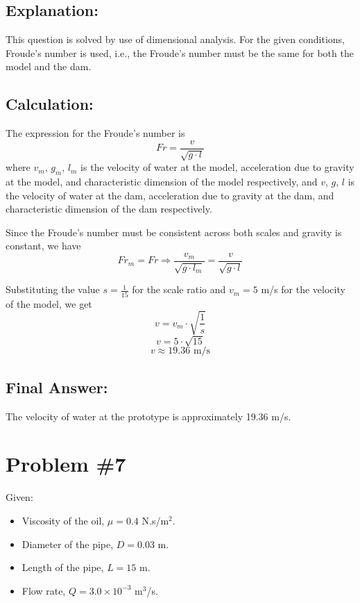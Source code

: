 \documentclass{article}
\begin{document}
\subsection*{Explanation:}
This question is solved by use of dimensional analysis. For the given conditions, Froude's number is used, i.e., the Froude's number must be the same for both the model and the dam.

\subsection*{Calculation:}
The expression for the Froude's number is
\[ Fr = \frac{v}{\sqrt{g \cdot l}} \]
where \( v_m \), \( g_m \), \( l_m \) is the velocity of water at the model, acceleration due to gravity at the model, and characteristic dimension of the model respectively, and \( v \), \( g \), \( l \) is the velocity of water at the dam, acceleration due to gravity at the dam, and characteristic dimension of the dam respectively.

Since the Froude's number must be consistent across both scales and gravity is constant, we have
\[ Fr_m = Fr \Rightarrow \frac{v_m}{\sqrt{g \cdot l_m}} = \frac{v}{\sqrt{g \cdot l}} \]

Substituting the value \( s = \frac{1}{15} \) for the scale ratio and \( v_m = 5 \) m/s for the velocity of the model, we get
\[ v = v_m \cdot \sqrt{\frac{1}{s}} \]
\[ v = 5 \cdot \sqrt{15} \]
\[ v \approx 19.36 \text{ m/s} \]

\subsection*{Final Answer:}
The velocity of water at the prototype is approximately 19.36 m/s.

\newpage
\section*{Problem \#7}

Given:
\begin{itemize}
    \item Viscosity of the oil, \( \mu = 0.4 \) N.s/m\(^2\).
    \item Diameter of the pipe, \( D = 0.03 \) m.
    \item Length of the pipe, \( L = 15 \) m.
    \item Flow rate, \( Q = 3.0 \times 10^{-3} \) m\(^3\)/s.
\end{itemize}
\end{document}

